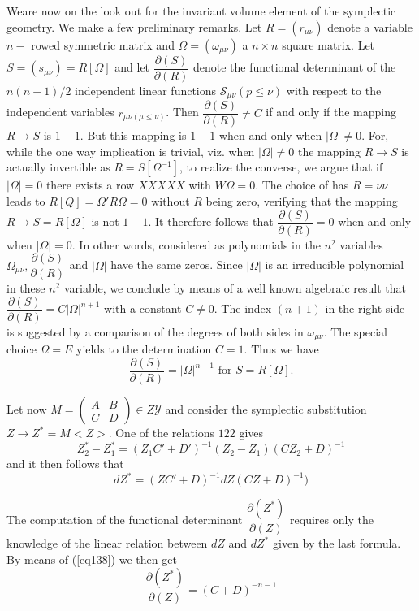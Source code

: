 We\pageoriginale  are now on the look out for the invariant volume
element of the 
symplectic geometry. We make a few preliminary remarks. Let $R =
(r_{\mu\nu})$ denote a variable $n -$ rowed symmetric matrix and
$\Omega = (\omega_{\mu \nu})$ a $n \times n$ square matrix. Let $S =
(s_{\mu \nu}) = R [\Omega]$ and let
$\dfrac{\partial(S)}{\partial(R)}$ denote the functional determinant
of the $n(n + 1)/2$ independent linear functions $\mathscr{S}_{\mu
  \nu} (p \le \nu)$ with respect to the independent variables $r _{\mu
  \nu(\mu \le \nu)}$. Then $\dfrac{\partial(S)}{\partial(R)} \neq C$
if and only if the mapping $R \rightarrow S$ is $1-1$. But this
mapping is $1-1$ when and only when $|\Omega| \neq 0$. For, while the
one way implication is trivial, viz. when $|\Omega| \neq 0$ the mapping
$R \rightarrow S$ is actually invertible as $R = S[\Omega^{-1}]$,
to realize the converse, we argue that if $|\Omega| = 0$ there exists
a row $XXXXX$ with $W \Omega = 0$. The choice of has $R = \nu \nu$
leads to $R [Q] = \Omega ' R \Omega = 0$ without $R$ being zero,
verifying that the mapping $R \rightarrow S = R[\Omega]$ is not
$1-1$. It therefore follows that $\dfrac{\partial (S)}{\partial(R)} = 0$
when and only when $|\Omega| = 0$. In other words, considered as
polynomials in the $n^2$ variables $\Omega_{\mu \nu},
\dfrac{\partial(S)}{\partial(R)}$  and $|\Omega|$ have the same
zeros. Since $|\Omega|$ is an irreducible polynomial in these $n^2$
variable, we conclude by means of a well known algebraic result that
$\dfrac{\partial(S)}{\partial(R)} = C|\Omega|^{n+1}$ with a constant
$C \neq 0$. The index $(n +1)$ in the right side is suggested by a
comparison of the degrees of both sides in $\omega_{\mu \nu }$. The
special choice $\Omega = E$ yields to the determination $C =1$. Thus
we have  
\begin{equation*}
\frac{\partial(S)}{\partial(R)} = |\Omega|^{n+1} \text{ for } S =
R[\Omega]. \tag{138}\label{eq138} 
\end{equation*}

Let now $M = \begin{pmatrix} A & B \\ C & D \end{pmatrix}  \in Z
\mathscr{Y}$ and consider the symplectic substitution $Z \rightarrow
Z^* = M < Z >$. One of the relations $122$ gives  
$$
Z^*_2 - Z^*_1 = (Z_1 C' + D' )^{-1} (Z_2 - Z_1)(CZ_2 + D)^{-1}
$$ \pageoriginale 
and it then follows that 
$$
dZ^* = (ZC' + D)^{-1} dZ (C Z + D)^{-1})
$$

The computation of the functional determinant $\dfrac{\partial
  (Z^*)}{\partial(Z)}$ requires only the knowledge of the linear
relation between $dZ$ and $dZ^*$ given by the last formula. By means
of (\ref{eq138}) we then get 
\begin{equation*}
\frac{\partial (Z^*)}{\partial(Z)} = (C + D)^{-n-1} \tag{139}\label{eq139}
\end{equation*}


